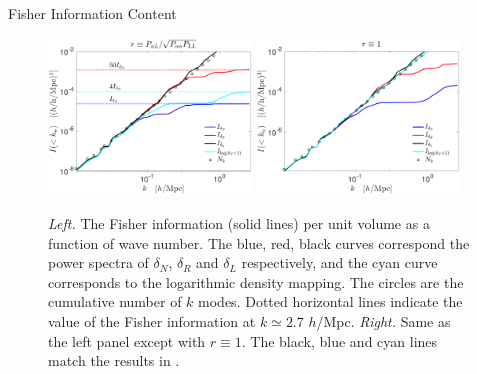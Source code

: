 \begin{section}{Fisher Information Content}
  \begin{figure}
    \includegraphics[width=0.48\textwidth]{fig4a.pdf}
    \includegraphics[width=0.48\textwidth]{fig4b.pdf}
    \centering
    \caption{{\it Left.} The Fisher information (solid lines) per unit volume as
      a function of wave number.  The blue, red, black curves correspond the power spectra
      of $\delta_N$, $\delta_R$ and $\delta_L$ respectively,
      and the cyan curve
      corresponds to the logarithmic density mapping. The circles
      are the cumulative number of $k$ modes.  Dotted horizontal lines indicate the value of the 
      Fisher information at $k \simeq 2.7$ $h$/Mpc.  {\it Right.} Same
      as the left panel except with $r\equiv 1$. The black, blue and cyan lines
      match the results in \cite{bib:Rimes2006,bib:Mark2009}.}
  \label{fig:fisherinfo}
\end{figure}
\end{section}

